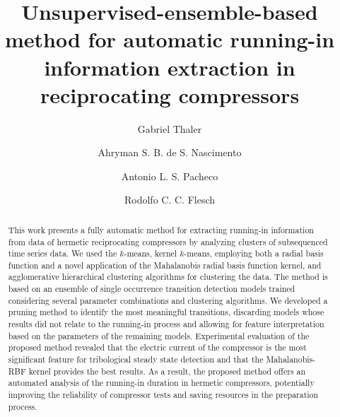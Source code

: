 \documentclass[preprint,11pt,number]{elsarticle}
\begin{document}
\title{Unsupervised-ensemble-based method for automatic running-in information extraction in reciprocating compressors}

\author[1]{Gabriel Thaler}

\author[1]{Ahryman S. B. de S. Nascimento}

\author[2]{Antonio L. S. Pacheco}

\author[3]{Rodolfo C. C. Flesch}






\begin{abstract}
This work presents a fully automatic method for extracting running-in information from data of hermetic reciprocating compressors by analyzing clusters of subsequenced time series data. We used the $k$-means, kernel $k$-means, employing both a radial basis function and a novel application of the Mahalanobis radial basis function kernel, and agglomerative hierarchical clustering algorithms for clustering the data. The method is based on an ensemble of single occurrence transition detection models trained considering several parameter combinations and clustering algorithms. We developed a pruning method to identify the most meaningful transitions, discarding models whose results did not relate to the running-in process and allowing for feature interpretation based on the parameters of the remaining models. Experimental evaluation of the proposed method revealed that the electric current of the compressor is the most significant feature for tribological steady state detection and that the Mahalanobis-RBF kernel provides the best results. As a result, the proposed method offers an automated analysis of the running-in duration in hermetic compressors, potentially improving the reliability of compressor tests and saving resources in the preparation process.
\end{abstract}
\end{document}
